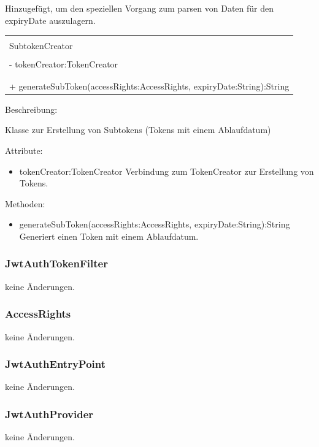 \documentclass[a4paper,20pt,oneside]{book}
\begin{document}
	Hinzugefügt, um den speziellen Vorgang zum parsen von Daten für den expiryDate auszulagern.	
	
	\vspace{0.5cm}
	\centering
	\begin{tabular}{|l|}
	\hline \\
	SubtokenCreator \\ \hline \\
	-  tokenCreator:TokenCreator \\
	\\ \hline \\
   + generateSubToken(accessRights:AccessRights, expiryDate:String):String
 \\ \hline
	\end{tabular}
		 
	\vspace{0.5cm}
	\raggedright
	Beschreibung:
	
	Klasse zur Erstellung von Subtokens (Tokens mit einem Ablaufdatum)
	
	\vspace{0.5cm}
	Attribute:
	\begin{itemize}
	\item tokenCreator:TokenCreator\linebreak
Verbindung zum TokenCreator zur Erstellung von Tokens.
	\end{itemize}
	
	Methoden:
	\begin{itemize}
	\item generateSubToken(accessRights:AccessRights, expiryDate:String):String\linebreak
	Generiert einen Token mit einem Ablaufdatum.
	\end{itemize}
	
	\subsubsection{JwtAuthTokenFilter}
	keine Änderungen.

	\subsubsection{AccessRights}
	keine Änderungen.
	
	\subsubsection{JwtAuthEntryPoint}
	keine Änderungen.
	
	\subsubsection{JwtAuthProvider}
	keine Änderungen.
	
\end{document}
